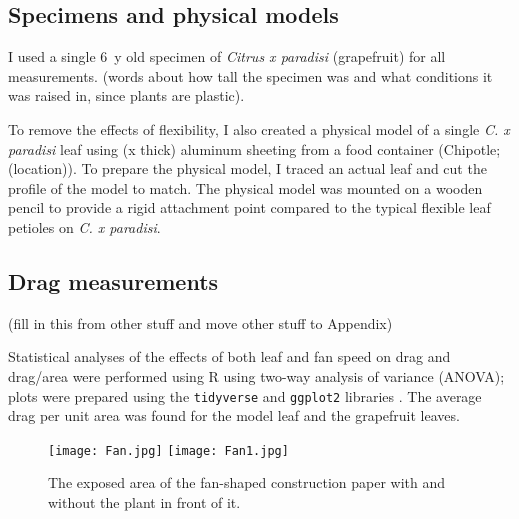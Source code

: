 \subsection{Specimens and physical models}
I used a single \SI{6}{y} old specimen of \emph{Citrus x paradisi} (grapefruit) for all measurements. (words about how tall the specimen was and what conditions it was raised in, since plants are plastic). 

To remove the effects of flexibility, I also created a physical model of a single \emph{C. x paradisi} leaf using (x thick) aluminum sheeting from a food container (Chipotle; (location)). To prepare the physical model, I traced an actual leaf and cut the profile of the model to match. The physical model was mounted on a wooden pencil to provide a rigid attachment point compared to the typical flexible leaf petioles on \emph{C. x paradisi}. 

\subsection{Drag measurements}
(fill in this from other stuff and move other stuff to Appendix)


Statistical analyses of the effects of both leaf and fan speed on drag and drag/area were performed using R \citep{r2020} using two-way analysis of variance (ANOVA); plots were prepared using the \lstinline{tidyverse} and \lstinline{ggplot2} libraries \citep{wickham2019tidyverse}. The average drag per unit area was found for the model leaf and the grapefruit leaves.

\begin{figure}
\begin{center}
\texttt{[image: Fan.jpg]}
\texttt{[image: Fan1.jpg]}
\end{center}
\caption{The exposed area of the fan-shaped construction paper with and without the plant in front of it.}
\label{fig:Appendix1}
\end{figure}


